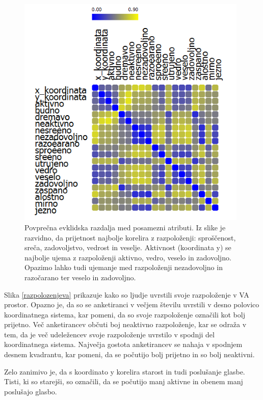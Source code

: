 \documentclass[a4paper, 12pt]{book}
\begin{document}
{\begin{figure}[hbt]
\centering
\includegraphics[width=11cm]{images/korelacija_custva_pris.png}

\caption{Povprečna evklidska razdalja med posamezni atributi. Iz slike je razvidno, da prijetnost najbolje korelira z razpoloženji: sproščenost, sreča, zadovoljstvo, vedrost in veselje. Aktivnost (koordinata y) se najbolje ujema z razpoloženji aktivno, vedro, veselo in zadovoljno. Opazimo lahko tudi ujemanje med razpoloženji nezadovoljno in razočarano ter veselo in zadovoljno.}
\label{prisotnost_kor}
\end{figure}

Slika \ref{razpolozenjeva} prikazuje kako so ljudje uvrstili svoje razpoloženje v VA prostor. Opazno je, da so se anketiranci v večjem številu uvrstili v desno polovico koordinatnega sistema, kar pomeni, da so svoje razpoloženje označili kot bolj prijetno. Več anketirancev občuti boj neaktivno razpoloženje, kar se odraža v tem, da je več udeležencev svoje razpoloženje uvrstilo v spodnji del koordinatnega sistema. Največja gostota anketirancev se nahaja v spodnjem desnem kvadrantu, kar pomeni, da se počutijo bolj prijetno in so bolj neaktivni. 

Zelo zanimivo je, da s koordinato y korelira starost in tudi poslušanje glasbe. Tisti, ki so starejši, so označili, da se počutijo manj aktivne in obenem manj poslušajo glasbo. 

}
\end{document}
